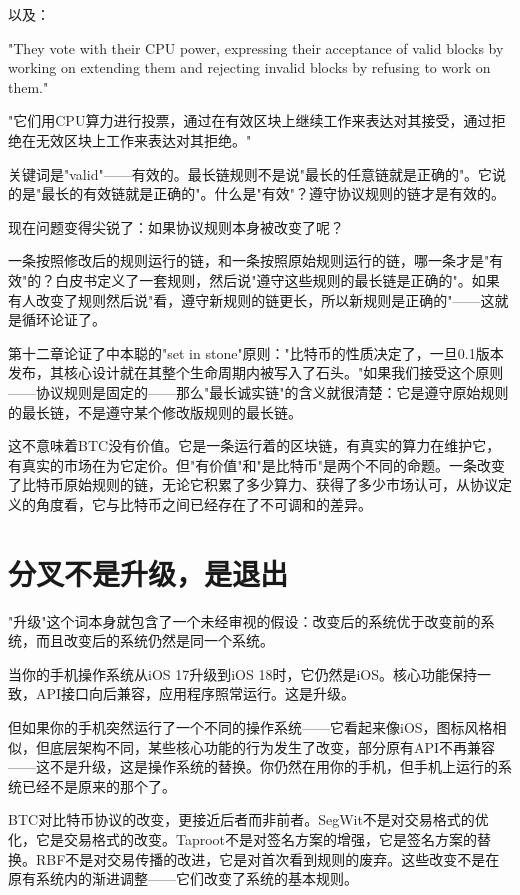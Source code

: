 \documentclass[a4paper,12pt,openany]{ctexbook}
\newenvironment{quoting}{%
  \par\vspace{0.5em}%
  \begin{list}{}{%
    \setlength{\leftmargin}{2em}%
    \setlength{\rightmargin}{2em}%
    \setlength{\parsep}{0.3em}%
    \setlength{\itemsep}{0pt}%
    \setlength{\topsep}{0pt}%
  }%
  \item\relax
}{%
  \end{list}%
  \par\vspace{0.5em}%
}
\begin{document}
以及：


\begin{quoting}
\small
"They vote with their CPU power, expressing their acceptance of valid blocks by working on extending them and rejecting invalid blocks by refusing to work on them."

"它们用CPU算力进行投票，通过在有效区块上继续工作来表达对其接受，通过拒绝在无效区块上工作来表达对其拒绝。"
\end{quoting}


关键词是"valid"——有效的。最长链规则不是说"最长的任意链就是正确的"。它说的是"最长的有效链就是正确的"。什么是"有效"？遵守协议规则的链才是有效的。

现在问题变得尖锐了：如果协议规则本身被改变了呢？

一条按照修改后的规则运行的链，和一条按照原始规则运行的链，哪一条才是"有效"的？白皮书定义了一套规则，然后说"遵守这些规则的最长链是正确的"。如果有人改变了规则然后说"看，遵守新规则的链更长，所以新规则是正确的"——这就是循环论证了。

第十二章论证了中本聪的"set in stone"原则："比特币的性质决定了，一旦0.1版本发布，其核心设计就在其整个生命周期内被写入了石头。"如果我们接受这个原则——协议规则是固定的——那么"最长诚实链"的含义就很清楚：它是遵守原始规则的最长链，不是遵守某个修改版规则的最长链。

这不意味着BTC没有价值。它是一条运行着的区块链，有真实的算力在维护它，有真实的市场在为它定价。但"有价值"和"是比特币"是两个不同的命题。一条改变了比特币原始规则的链，无论它积累了多少算力、获得了多少市场认可，从协议定义的角度看，它与比特币之间已经存在了不可调和的差异。


\section*{分叉不是升级，是退出}


"升级"这个词本身就包含了一个未经审视的假设：改变后的系统优于改变前的系统，而且改变后的系统仍然是同一个系统。

当你的手机操作系统从iOS 17升级到iOS 18时，它仍然是iOS。核心功能保持一致，API接口向后兼容，应用程序照常运行。这是升级。

但如果你的手机突然运行了一个不同的操作系统——它看起来像iOS，图标风格相似，但底层架构不同，某些核心功能的行为发生了改变，部分原有API不再兼容——这不是升级，这是操作系统的替换。你仍然在用你的手机，但手机上运行的系统已经不是原来的那个了。

BTC对比特币协议的改变，更接近后者而非前者。SegWit不是对交易格式的优化，它是交易格式的改变。Taproot不是对签名方案的增强，它是签名方案的替换。RBF不是对交易传播的改进，它是对首次看到规则的废弃。这些改变不是在原有系统内的渐进调整——它们改变了系统的基本规则。
\end{document}
